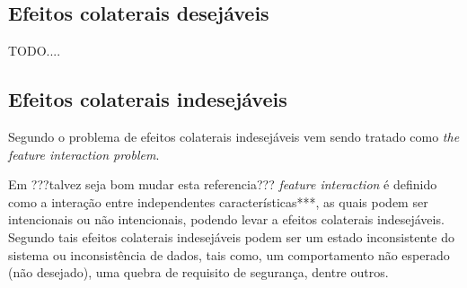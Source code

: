 \subsection{Efeitos colaterais desejáveis}
TODO....
\subsection{Efeitos colaterais indesejáveis}
Segundo \cite{Weiss:2007}o problema de efeitos colaterais indesejáveis vem sendo tratado como \textit{the feature interaction problem}.

Em \cite{Weiss}???talvez seja bom mudar esta referencia??? \textit{feature interaction} é definido como a interação entre independentes características***, as quais podem ser intencionais ou não intencionais, podendo levar a efeitos colaterais indesejáveis. Segundo \cite{Weiss:2007 } tais efeitos colaterais indesejáveis podem ser um estado inconsistente do sistema ou inconsistência de dados, tais como, um comportamento não esperado (não desejado), uma quebra de requisito de segurança, dentre outros.

